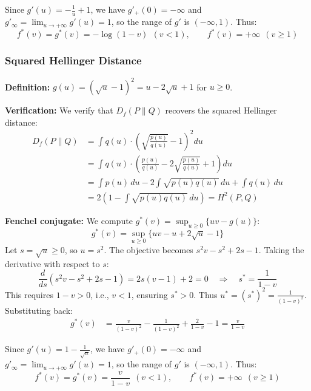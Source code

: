 Since $g'(u) = -\frac{1}{u} + 1$, we have $g'_+(0) = -\infty$ and $g'_\infty = \lim_{u \to +\infty} g'(u) = 1$, so the range of $g'$ is $(-\infty, 1)$. Thus:
\begin{equation*}
f^*(v) = g^*(v) = -\log(1-v) \ \ (v < 1), \qquad f^*(v) = +\infty \ \ (v \geq 1)
\end{equation*}

\subsubsection{Squared Hellinger Distance}

\textbf{Definition:} $g(u) = (\sqrt{u} - 1)^2 = u - 2\sqrt{u} + 1$ for $u \geq 0$.

\textbf{Verification:} We verify that $D_f(P \| Q)$ recovers the squared Hellinger distance:
\begin{align*}
D_f(P \| Q) &= \int q(u) \cdot \left( \sqrt{\frac{p(u)}{q(u)}} - 1 \right)^2 du \nonumber \\
&= \int q(u) \cdot \left( \frac{p(u)}{q(u)} - 2\sqrt{\frac{p(u)}{q(u)}} + 1 \right) du \nonumber \\
&= \int p(u) \, du - 2 \int \sqrt{p(u) q(u)} \, du + \int q(u) \, du \nonumber \\
&= 2 \left( 1 - \int \sqrt{p(u) q(u)} \, du \right) = H^2(P, Q)
\end{align*}

\textbf{Fenchel conjugate:} We compute $g^*(v) = \sup_{u \geq 0} \{ uv - g(u) \}$:
\begin{equation*}
g^*(v) = \sup_{u \geq 0} \{ uv - u + 2\sqrt{u} - 1 \}
\end{equation*}
Let $s = \sqrt{u} \geq 0$, so $u = s^2$. The objective becomes $s^2 v - s^2 + 2s - 1$. Taking the derivative with respect to $s$:
\begin{equation*}
\frac{d}{ds}\left( s^2 v - s^2 + 2s - 1 \right) = 2s(v-1) + 2 = 0 \quad \Rightarrow \quad s^* = \frac{1}{1-v}
\end{equation*}
This requires $1 - v > 0$, i.e., $v < 1$, ensuring $s^* > 0$. Thus $u^* = (s^*)^2 = \frac{1}{(1-v)^2}$. Substituting back:
\begin{align*}
g^*(v) &= \frac{v}{(1-v)^2} - \frac{1}{(1-v)^2} + \frac{2}{1-v} - 1 \nonumber = \frac{v}{1-v}
\end{align*}

Since $g'(u) = 1 - \frac{1}{\sqrt{u}}$, we have $g'_+(0) = -\infty$ and $g'_\infty = \lim_{u \to +\infty} g'(u) = 1$, so the range of $g'$ is $(-\infty, 1)$. Thus:
\begin{equation*}
f^*(v) = g^*(v) = \frac{v}{1-v} \ \ (v < 1), \qquad f^*(v) = +\infty \ \ (v \geq 1)
\end{equation*}


